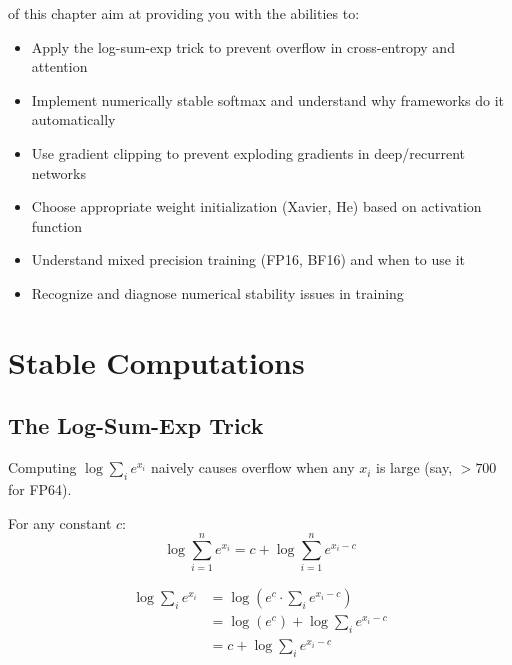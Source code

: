 \vspace{2.5em}
 of this chapter aim at providing you with the abilities to:
\begin{itemize}
    \item Apply the log-sum-exp trick to prevent overflow in cross-entropy and attention
    \item Implement numerically stable softmax and understand why frameworks do it automatically
    \item Use gradient clipping to prevent exploding gradients in deep/recurrent networks
    \item Choose appropriate weight initialization (Xavier, He) based on activation function
    \item Understand mixed precision training (FP16, BF16) and when to use it
    \item Recognize and diagnose numerical stability issues in training
\end{itemize}





\newpage
\section{Stable Computations}

\subsection{The Log-Sum-Exp Trick}

 Computing $\log\sum_i e^{x_i}$ naively causes overflow when any $x_i$ is large (say, $> 700$ for FP64).

 For any constant $c$:
\begin{equation}
    \log\sum_{i=1}^{n} e^{x_i} = c + \log\sum_{i=1}^{n} e^{x_i - c}
\end{equation}

\begin{align}
    \log\sum_i e^{x_i} &= \log\left(e^c \cdot \sum_i e^{x_i - c}\right) \\
    &= \log(e^c) + \log\sum_i e^{x_i - c} \\
    &= c + \log\sum_i e^{x_i - c}
\end{align}

